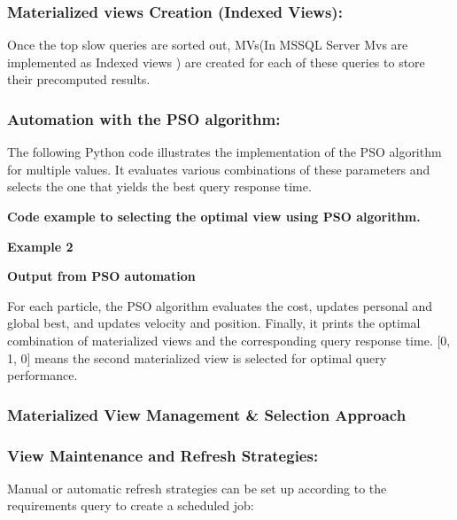 \subsubsection{ Materialized views Creation (Indexed Views):} Once the top slow queries are sorted out, MVs(In MSSQL Server Mvs are implemented as Indexed views ) are created for each of these queries to store their precomputed results.\vspace{.4cm}

  

  


\subsubsection{Automation with the PSO algorithm:}
 The following Python code illustrates the implementation of the PSO algorithm for multiple values. It evaluates various combinations of these parameters and selects the one that yields the best query response time.\vspace{.4cm}
 


\textbf{Code example to selecting the optimal view using PSO algorithm.}

  \vspace{.4cm}

 

\textbf{Example 2}

\textbf{Output from PSO automation } 

  
  


 For each particle, the PSO algorithm evaluates the cost, updates personal and global best, and updates velocity and position. Finally, it prints the optimal combination of materialized views and the corresponding query response time.
 [0, 1, 0] means the second materialized view is selected for optimal query performance.
  


\subsubsection{Materialized View Management \& Selection Approach}
\subsubsection{View Maintenance and Refresh Strategies:} Manual or automatic refresh strategies can be set up according to the requirements query to create a scheduled job:

